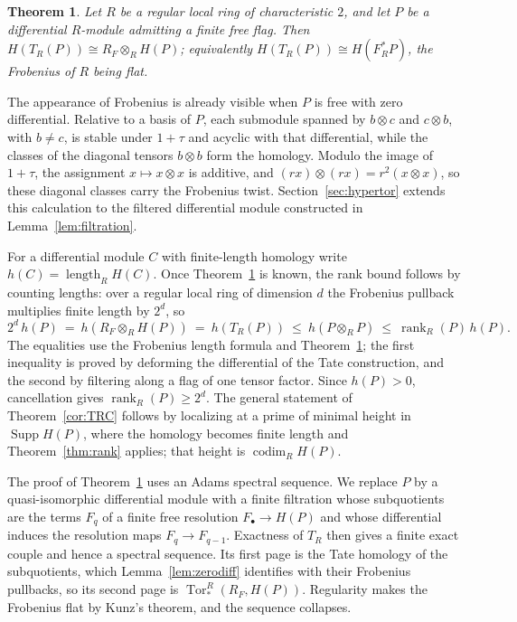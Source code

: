 \documentclass[11pt,reqno]{amsart}
\theoremstyle{plain}
\newtheorem{thmintro}{Theorem}
\theoremstyle{definition}
\DeclareMathOperator{\Tor}{Tor}
\DeclareMathOperator{\length}{length}
\DeclareMathOperator{\rank}{rank}
\DeclareMathOperator{\codim}{codim}
\DeclareMathOperator{\Supp}{Supp}
\newcommand{\Tate}{T}                 %
\newcommand{\Frob}{F_R^{*}}           %
\newcommand{\Rone}{R_F}               %
\newcommand{\htot}{h}
\begin{document}
\begin{thmintro}\label{thm:main}
Let $R$ be a regular local ring of characteristic $2$, and let $P$ be a differential $R$-module
admitting a finite free flag.  Then $H(\Tate_R(P))\cong\Rone\otimes_RH(P)$; equivalently
$H(\Tate_R(P))\cong H(\Frob P)$, the Frobenius of $R$ being flat.
\end{thmintro}

The appearance of Frobenius is already visible when $P$ is free with zero differential.  Relative
to a basis of $P$, each submodule spanned by $b\otimes c$ and $c\otimes b$, with $b\ne c$, is
stable under $1+\tau$ and acyclic with that differential, while the classes of the diagonal tensors
$b\otimes b$ form the homology.
Modulo the image of $1+\tau$, the assignment $x\mapsto x\otimes x$ is additive, and
$(rx)\otimes(rx)=r^2(x\otimes x)$, so these diagonal classes carry the Frobenius twist.
Section~\ref{sec:hypertor} extends this calculation to the filtered differential module constructed in
Lemma~\ref{lem:filtration}.

For a differential module $C$ with finite-length homology write $\htot(C)=\length_RH(C)$.  Once
Theorem~\ref{thm:main} is known, the rank bound follows by counting lengths: over a regular local ring
of dimension $d$ the Frobenius pullback multiplies finite length by $2^d$, so
\[
 2^d\,\htot(P)\ =\ \htot(\Rone\otimes_RH(P))\ =\ \htot(\Tate_R(P))\ \le\ \htot(P\otimes_R P)\ \le\
 \rank_R(P)\,\htot(P).
\]
The equalities use the Frobenius length formula and Theorem~\ref{thm:main}; the first inequality is
proved by deforming the differential of the Tate construction, and the second by filtering along a
flag of one tensor factor.
Since $\htot(P)>0$, cancellation gives $\rank_R(P)\ge 2^d$.  The general statement of
Theorem~\ref{cor:TRC} follows by localizing at a prime of minimal height in $\Supp H(P)$, where the
homology becomes finite length and Theorem~\ref{thm:rank} applies; that height is
$\codim_R H(P)$.

The proof of Theorem~\ref{thm:main} uses an Adams spectral sequence.  We replace $P$ by a
quasi-isomorphic differential module with a finite filtration whose subquotients are the terms
$F_q$ of a finite free resolution $F_\bullet\to H(P)$ and whose differential induces the resolution
maps $F_q\to F_{q-1}$.  Exactness of $\Tate_R$ then gives a finite exact couple and hence a
spectral sequence.
Its first page is the Tate homology of the subquotients, which Lemma~\ref{lem:zerodiff} identifies
with their Frobenius pullbacks, so its second page is $\Tor^R_*(\Rone,H(P))$.  Regularity makes the
Frobenius flat by Kunz's theorem, and the sequence collapses.
\end{document}
